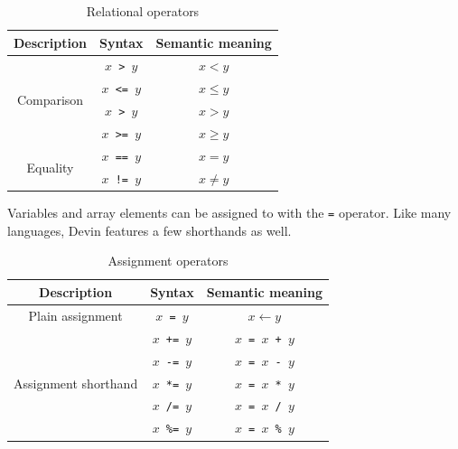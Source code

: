 \documentclass[UdineBachThesis,american,11pt]{PhdThesis}
\begin{document}
  \begin{table}[H]
    \centering

    \begin{tabular}{|c|c|c|}
      \hline

      Description &
      Syntax &
      Semantic meaning \\
      \hline

      \multirow{4}{*}{Comparison} &
      \texttt{$x$ > $y$} &
      $x < y$ \\

      &
      \texttt{$x$ <= $y$} &
      $x \leq y$ \\

      &
      \texttt{$x$ > $y$} &
      $x > y$ \\

      &
      \texttt{$x$ >= $y$} &
      $x \geq y$ \\

      \multirow{2}{*}{Equality} &
      \texttt{$x$ == $y$} &
      $x = y$ \\

      &
      \texttt{$x$ != $y$} &
      $x \neq y$ \\
      \hline
    \end{tabular}

    \caption{Relational operators}
  \end{table}

  Variables and array elements can be assigned to with the \texttt{=} operator.
  Like many languages, Devin features a few shorthands as well.

  \begin{table}[H]
    \centering

    \begin{tabular}{|c|c|c|}
      \hline

      Description &
      Syntax &
      Semantic meaning \\
      \hline

      Plain assignment &
      \texttt{$x$ = $y$} &
      $x \leftarrow y$ \\

      \multirow{5}{*}{Assignment shorthand} &
      \texttt{$x$ += $y$} &
      \texttt{$x$ = $x$ + $y$} \\

      &
      \texttt{$x$ -= $y$} &
      \texttt{$x$ = $x$ - $y$} \\

      &
      \texttt{$x$ *= $y$} &
      \texttt{$x$ = $x$ * $y$} \\

      &
      \texttt{$x$ /= $y$} &
      \texttt{$x$ = $x$ / $y$} \\

      &
      \texttt{$x$ \%= $y$} &
      \texttt{$x$ = $x$ \% $y$} \\
      \hline
    \end{tabular}

    \caption{Assignment operators}
    \label{table:assignment-operators}
  \end{table}
\end{document}
